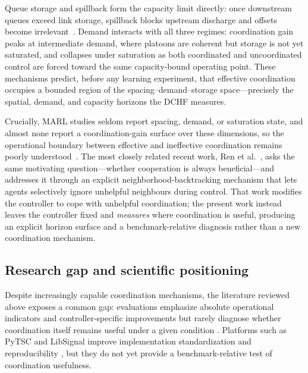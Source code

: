 \documentclass[review,12pt]{elsarticle}
\begin{document}
Queue storage and spillback form the capacity limit directly: once downstream queues exceed link storage, spillback blocks upstream discharge and offsets become irrelevant~\cite{haowu2024,pangweiwang2024}. Demand interacts with all three regimes: coordination gain peaks at intermediate demand, where platoons are coherent but storage is not yet saturated, and collapses under saturation as both coordinated and uncoordinated control are forced toward the same capacity-bound operating point. These mechanisms predict, before any learning experiment, that effective coordination occupies a bounded region of the spacing--demand--storage space---precisely the spatial, demand, and capacity horizons the DCHF measures.

Crucially, MARL studies seldom report spacing, demand, or saturation state, and almost none report a coordination-gain surface over these dimensions, so the operational boundary between effective and ineffective coordination remains poorly understood~\cite{ren2025cooperative,abidi2025analyzing}. The most closely related recent work, Ren et al.~\cite{ren2025cooperative}, asks the same motivating question---whether cooperation is always beneficial---and addresses it through an explicit neighborhood-backtracking mechanism that lets agents selectively ignore unhelpful neighbours during control. That work modifies the controller to cope with unhelpful coordination; the present work instead leaves the controller fixed and \emph{measures} where coordination is useful, producing an explicit horizon surface and a benchmark-relative diagnosis rather than a new coordination mechanism.

\subsection{Research gap and scientific positioning}
\label{sec:gap}

Despite increasingly capable coordination mechanisms, the literature
reviewed above exposes a common gap: evaluations emphasize absolute
operational indicators and controller-specific improvements but rarely
diagnose whether coordination itself remains useful under a given condition
\cite{nie2025cmrm,kolat2023multi,olusanya2025multi,
michailidis2025traffic}. Platforms such as PyTSC and LibSignal improve
implementation standardization and reproducibility
\cite{bokade2025pytsc,mei2024libsignal}, but they do not yet provide a
benchmark-relative test of coordination usefulness.
\end{document}
